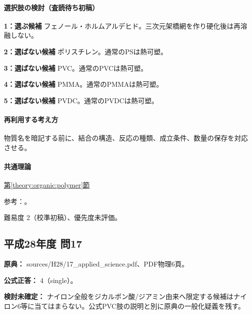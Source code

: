 \paragraph{選択肢の検討（査読待ち初稿）}\mbox{}\par

\noindent\textbf{1：選ぶ候補} フェノール・ホルムアルデヒド。三次元架橋網を作り硬化後は再溶融しない。\par

\noindent\textbf{2：選ばない候補} ポリスチレン。通常のPSは熱可塑。\par

\noindent\textbf{3：選ばない候補} PVC。通常のPVCは熱可塑。\par

\noindent\textbf{4：選ばない候補} PMMA。通常のPMMAは熱可塑。\par

\noindent\textbf{5：選ばない候補} PVDC。通常のPVDCは熱可塑。\par

\paragraph{再利用する考え方} 物質名を暗記する前に、結合の構造、反応の種類、成立条件、数量の保存を対応させる。

\paragraph{共通理論} \hyperref[theory:organic:polymer]{第\ref*{theory:organic:polymer}節}

\par 参考：\cite{organic_physical,organic_enpla}。

\par 難易度 2（校準初稿）、優先度未評価。

\subsection{平成28年度 問17}
\label{q:h28-reg-applied-17}

\noindent\textbf{原典：} sources/H28/17\_applied\_science.pdf、PDF物理6頁。

\textbf{公式正答：} 4（single）。

\par\textbf{検討未確定：} ナイロン全般をジカルボン酸/ジアミン由来へ限定する候補はナイロン6等に当てはまらない。公式PVC肢の説明と別に原典の一般化疑義を残す。

